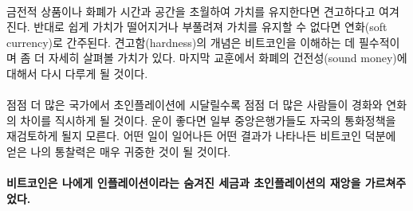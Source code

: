 \paragraph{}
금전적 상품이나 화폐가 시간과 공간을 초월하여 가치를 유지한다면 견고하다고 여겨진다. 
반대로 쉽게 가치가 떨어지거나 부풀려져 가치를 유지할 수 없다면 연화(soft currency)로 간주된다. 
견고함(hardness)의 개념은 비트코인을 이해하는 데 필수적이며 좀 더 자세히 살펴볼 가치가 있다.
마지막 교훈에서 화폐의 건전성(sound money)에 대해서 다시 다루게 될 것이다.


\paragraph{}
점점 더 많은 국가에서 초인플레이션에 시달릴수록 점점 더 많은 사람들이 경화와 연화의 차이를 직시하게 될 것이다. 
운이 좋다면 일부 중앙은행가들도 자국의 통화정책을 재검토하게 될지 모른다. 
어떤 일이 일어나든 어떤 결과가 나타나든 비트코인 덕분에 얻은 나의 통찰력은 매우 귀중한 것이 될 것이다.

\paragraph{비트코인은 나에게 인플레이션이라는 숨겨진 세금과 초인플레이션의 재앙을 가르쳐주었다.}

